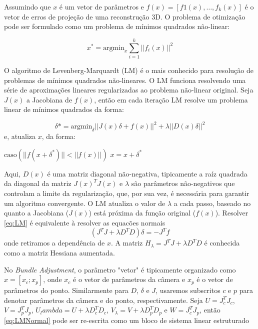\begin{itemize}
Assumindo que $x$ é um vetor de parâmetros e $f(x) = [f1(x), \dots, f_k(x)]$ é o vetor de erros de projeção de uma reconstrução 3D. O problema de otimização pode ser  formulado como um problema de mínimos quadrados não-linear:

\begin{equation}
x^* = \text{argmin}_x \sum_{i=1}^k || f_i(x)||^2
\end{equation}

O algoritmo de Levenberg-Marquardt (LM) é o mais conhecido para resolução de problemas de mínimos quadrados não-lineares. O LM funciona resolvendo uma série de aproximações lineares regularizadas ao problema não-linear original. Seja $J(x)$ a Jacobiana de $f(x)$, então em cada iteração LM resolve um problema linear de mínimos quadrados da forma:

\begin{equation}
\label{eq:LM}
\delta* = \text{argmin}_\delta || J(x)\delta + f(x) ||^2 + \lambda ||D(x)\delta||^2 
\end{equation}
e, atualiza $x$, da forma:

\begin{algorithm}
\label{LMattX}
\begin{algorithmic}[1]
\State $\text{caso} (||f(x + \delta^*)|| < || f(x) ||)$
\State	$x = x + \delta^*$
\end{algorithmic}
\end{algorithm}


Aqui, $D(x)$ é uma matriz diagonal não-negativa, tipicamente a raíz quadrada da diagonal da matriz $J(x)^T J(x)$ e $\lambda$ são parâmetros não-negativos que controlam a limite da regularização, que, por sua vez, é necessária para garantir um algoritmo convergente. O LM atualiza o valor de $\lambda$ a cada passo, baseado no quanto a Jacobiana ($J(x)$) está próxima da função original ($f(x)$).
Resolver \ref{eq:LM} é equivalente à resolver as equacões normais
\begin{equation}
\label{eq:LMNormal}
(J^T J + \lambda D^T D)\delta = -J^T f
\end{equation}
onde retiramos a dependência de $x$. A matriz $H_\lambda = J^T J + \lambda D^T D$ é conhecida como a matriz Hessiana aumentada. 

No \emph{Bundle Adjustment}, o parâmetro "vetor" é tipicamente organizado como $x = [x_c;x_p]$, onde $x_c$ é o vetor de parâmetros da câmera e $x_p$ é o vetor de parâmetros do ponto. Similarmente para $D$, $\delta$ e $J$, usaremos subscritos $c$ e $p$ para denotar parâmetros da câmera e do ponto, respectivamente. 
Seja $U = J_c^T J_c$, $V = J_p^T J_p$, $U_lambda = U + \lambda D_c^T D_c$, $V_\lambda = V + \lambda D_p^T D_p$ e $W = J_c^T J_p$, então \ref{eq:LMNormal} pode ser re-escrita como um bloco de sistema linear estruturado


\end{itemize}
